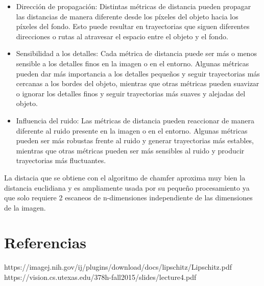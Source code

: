 \documentclass{article}
\begin{document}
\begin{itemize}
  \begin{itemize}
  \item Dirección de propagación: Distintas métricas de distancia pueden propagar las distancias de manera diferente desde los píxeles del objeto hacia los píxeles del fondo. Esto puede resultar en trayectorias que siguen diferentes direcciones o rutas al atravesar el espacio entre el objeto y el fondo.
  \item Sensibilidad a los detalles: Cada métrica de distancia puede ser más o menos sensible a los detalles finos en la imagen o en el entorno. Algunas métricas pueden dar más importancia a los detalles pequeños y seguir trayectorias más cercanas a los bordes del objeto, mientras que otras métricas pueden suavizar o ignorar los detalles finos y seguir trayectorias más suaves y alejadas del objeto.
  \item Influencia del ruido: Las métricas de distancia pueden reaccionar de manera diferente al ruido presente en la imagen o en el entorno. Algunas métricas pueden ser más robustas frente al ruido y generar trayectorias más estables, mientras que otras métricas pueden ser más sensibles al ruido y producir trayectorias más fluctuantes.
  \end{itemize}
  
\end{itemize}

La distacia que se obtiene con el algoritmo de chamfer aproxima muy bien la distancia euclidiana y es ampliamente usada por su pequeño procesamiento ya que solo requiere 2 escaneos de n-dimensiones independiente de las dimensiones de la imagen.

\section*{Referencias}

https://imagej.nih.gov/ij/plugins/download/docs/lipschitz/Lipschitz.pdf
https://vision.cs.utexas.edu/378h-fall2015/slides/lecture4.pdf
\end{document}
